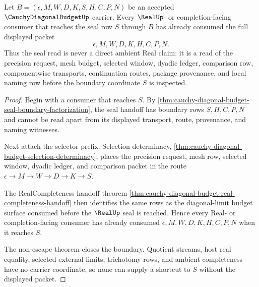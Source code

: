\begin{theorem}
\label{thm:cauchy-diagonal-budget-seal-consumer-coverage}
Let $B=(\epsilon,M,W,D,K,S,H,C,P,N)$ be an accepted $\CauchyDiagonalBudgetUp$ carrier. Every $\RealUp$- or completion-facing consumer that reaches the seal row $S$ through $B$ has already consumed the full displayed packet
$$
\epsilon,M,W,D,K,H,C,P,N.
$$
Thus the seal read is never a direct ambient Real claim: it is a read of the precision request, mesh budget, selected window, dyadic ledger, comparison row, componentwise transports, continuation routes, package provenance, and local naming row before the boundary coordinate $S$ is inspected.
\end{theorem}
\begin{proof}
Begin with a consumer that reaches $S$. By \autoref{thm:cauchy-diagonal-budget-seal-boundary-factorization}, the seal handoff has boundary rows $S,H,C,P,N$ and cannot be read apart from its displayed transport, route, provenance, and naming witnesses.

Next attach the selector prefix. Selection determinacy, \autoref{thm:cauchy-diagonal-budget-selection-determinacy}, places the precision request, mesh row, selected window, dyadic ledger, and comparison packet in the route $\epsilon \to M \to W \to D \to K \to S$.

The RealCompleteness handoff theorem \autoref{thm:cauchy-diagonal-budget-real-completeness-handoff} then identifies the same rows as the diagonal-limit budget surface consumed before the $\RealUp$ seal is reached. Hence every Real- or completion-facing consumer has already consumed $\epsilon,M,W,D,K,H,C,P,N$ when it reaches $S$.

The non-escape theorem closes the boundary. Quotient streams, host real equality, selected external limits, trichotomy rows, and ambient completeness have no carrier coordinate, so none can supply a shortcut to $S$ without the displayed packet.
\end{proof}

